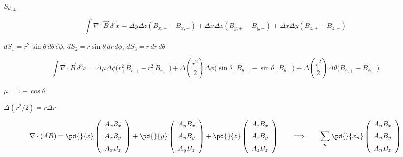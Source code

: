 \documentclass{article}
\begin{document}
$S_{d,\pm}$
\pagebreak

\[
     \int \nabla\cdot\vec{B}\, d^3x
   =  \Delta y\Delta z \left(B_{x,+} - B_{x,-}\right)
    + \Delta x\Delta z \left(B_{y,+} - B_{y,-}\right)
    + \Delta x\Delta y \left(B_{z,+} - B_{z,-}\right)
\]
\pagebreak

$ dS_1 = r^2\,\sin\theta\,d\theta\,d\phi,
\, dS_2 = r\sin\theta\, dr\,d\phi,\, dS_3 = r\,dr\,d\theta$
\pagebreak

\[
     \int \nabla\cdot\vec{B}\, d^3x
   =  \Delta \mu\Delta\phi
        \Big(r^2_+B_{r,+} - r^2_-B_{r,-}\Big)
    + \Delta\left(\frac{r^2}{2}\right) \Delta\phi
        \Big(  \sin\theta_+B_{\theta,+} - \sin\theta_-B_{\theta,-}\Big)
    + \Delta\left(\frac{r^2}{2}\right)\Delta\theta
        \Big(B_{\phi,+} - B_{\phi,-}\Big)
\]
\pagebreak

$\mu = 1-\cos\theta$
\pagebreak

$\Delta (r^2/2) = r\Delta r$
\pagebreak

\[
     \nabla\cdot(\vec{A}\vec{B}) =
     \pd{}{x}\left(\begin{array}{l}
       A_xB_x \\ \noalign{\medskip}
       A_xB_y \\ \noalign{\medskip}
       A_xB_z
     \end{array}\right)
     +
     \pd{}{y}\left(\begin{array}{l}
       A_yB_x \\ \noalign{\medskip}
       A_yB_y \\ \noalign{\medskip}
       A_yB_z
     \end{array}\right)
     +
     \pd{}{z}\left(\begin{array}{l}
       A_zB_x \\ \noalign{\medskip}
       A_zB_y \\ \noalign{\medskip}
       A_zB_z
     \end{array}\right)
     \qquad\Longrightarrow\qquad
     \sum_n\pd{}{x_n}\left(\begin{array}{l}
       A_nB_x \\ \noalign{\medskip}
       A_nB_y \\ \noalign{\medskip}
       A_nB_z
     \end{array}\right)
   \]
\pagebreak
\end{document}
